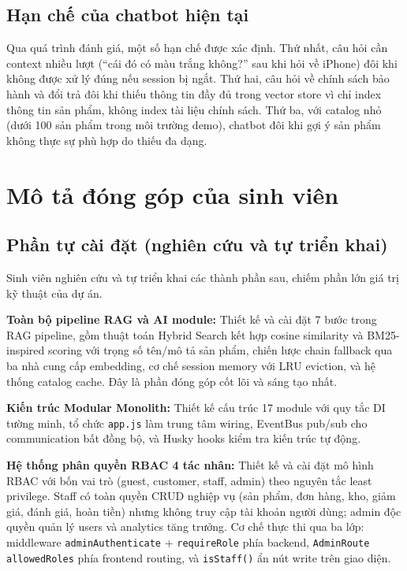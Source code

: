 \subsection{Hạn chế của chatbot hiện tại}
\label{sec:c4_rag_limitations}

Qua quá trình đánh giá, một số hạn chế được xác định. Thứ nhất, câu hỏi cần context nhiều lượt (``cái đó có màu trắng không?'' sau khi hỏi về iPhone) đôi khi không được xử lý đúng nếu session bị ngắt. Thứ hai, câu hỏi về chính sách bảo hành và đổi trả đôi khi thiếu thông tin đầy đủ trong vector store vì chỉ index thông tin sản phẩm, không index tài liệu chính sách. Thứ ba, với catalog nhỏ (dưới 100 sản phẩm trong môi trường demo), chatbot đôi khi gợi ý sản phẩm không thực sự phù hợp do thiếu đa dạng.

\section{Mô tả đóng góp của sinh viên}
\label{sec:c4_contributions}

\subsection{Phần tự cài đặt (nghiên cứu và tự triển khai)}

Sinh viên nghiên cứu và tự triển khai các thành phần sau, chiếm phần lớn giá trị kỹ thuật của dự án.

\textbf{Toàn bộ pipeline RAG và AI module:} Thiết kế và cài đặt 7 bước trong RAG pipeline, gồm thuật toán Hybrid Search kết hợp cosine similarity và BM25-inspired scoring với trọng số tên\slash mô tả sản phẩm, chiến lược chain fallback qua ba nhà cung cấp embedding, cơ chế session memory với LRU eviction, và hệ thống catalog cache. Đây là phần đóng góp cốt lõi và sáng tạo nhất.

\textbf{Kiến trúc Modular Monolith:} Thiết kế cấu trúc 17 module với quy tắc DI tường minh, tổ chức \texttt{app.js} làm trung tâm wiring, EventBus pub/sub cho communication bất đồng bộ, và Husky hooks kiểm tra kiến trúc tự động.

\textbf{Hệ thống phân quyền RBAC 4 tác nhân:} Thiết kế và cài đặt mô hình RBAC với bốn vai trò (guest, customer, staff, admin) theo nguyên tắc least privilege. Staff có toàn quyền CRUD nghiệp vụ (sản phẩm, đơn hàng, kho, giảm giá, đánh giá, hoàn tiền) nhưng không truy cập tài khoản người dùng; admin độc quyền quản lý users và analytics tăng trưởng. Cơ chế thực thi qua ba lớp: middleware \texttt{adminAuthenticate} + \texttt{requireRole} phía backend, \texttt{AdminRoute allowedRoles} phía frontend routing, và \texttt{isStaff()} ẩn nút write trên giao diện.

